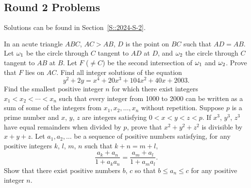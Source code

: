 \subsection{Round 2 Problems}

Solutions can be found in Section~\ref{S::2024-S-2}.

\begin{enumerate}
    \hyperrefitem[A::2024-S-2-1] In an acute triangle $ABC$, $AC > AB$, $D$ is the point on $BC$ such that $AD = AB$. Let $\omega_1$ be the circle through $C$ tangent to $AD$ at $D$, and $\omega_2$ the circle through $C$ tangent to $AB$ at $B$. Let $F$ ($\neq C$) be the second intersection of $\omega_1$ and $\omega_2$. Prove that $F$ lies on $AC$.
    \hyperrefitem[A::2024-S-2-2] Find all integer solutions of the equation \[y^2 + 2y = x^4 + 20x^3 + 104x^2 + 40x + 2003.\]
    \hyperrefitem[A::2024-S-2-3] Find the smallest positive integer $n$ for which there exist integers $x_1 < x_2 < \cdots < x_n$ such that every integer from 1000 to 2000 can be written as a sum of some of the integers from $x_1, x_2, \ldots, x_n$ without repetition.
    \hyperrefitem[A::2024-S-2-4] Suppose $p$ is a prime number and $x$, $y$, $z$ are integers satisfying $0 < x < y < z < p$. If $x^3$, $y^3$, $z^3$ have equal remainders when divided by $p$, prove that $x^2 + y^2 + z^2$ is divisible by $x + y + z$.
    \hyperrefitem[A::2024-S-2-5] Let $a_1, a_2, \ldots$ be a sequence of positive numbers satisfying, for any positive integers $k$, $l$, $m$, $n$ such that $k + n = m + l$, \[\frac{a_k + a_n}{1 + a_k a_n} = \frac{a_m + a_l}{1 + a_m a_l}.\] Show that there exist positive numbers $b$, $c$ so that $b \leq a_n \leq c$ for any positive integer $n$.
\end{enumerate}